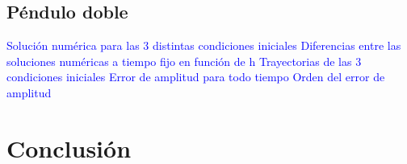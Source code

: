 \documentclass[aps,prb,twocolumn,superscriptaddress,floatfix,longbibliography]{revtex4-2}
\newcounter{para}
\begin{document}
\subsection{Péndulo doble}

\textcolor{blue}{Solución numérica para las 3 distintas condiciones iniciales}
\textcolor{blue}{Diferencias entre las soluciones numéricas a tiempo fijo en función de h}
\textcolor{blue}{Trayectorias de las 3 condiciones iniciales}
\textcolor{blue}{Error de amplitud para todo tiempo}
\textcolor{blue}{Orden del error de amplitud}

\section{Conclusión}





\end{document}
